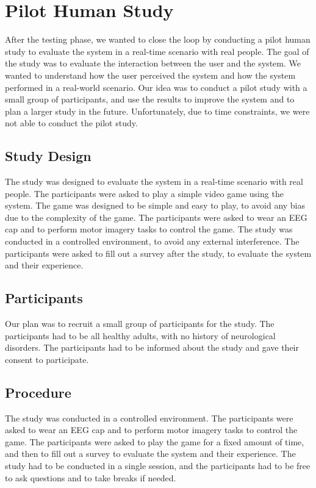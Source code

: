 \chapter{Pilot Human Study}\label{ch:human_study}
After the testing phase, we wanted to close the loop by conducting a pilot human study to evaluate the system in a real-time scenario with real people.
The goal of the study was to evaluate the interaction between the user and the system. 
We wanted to understand how the user perceived the system and how the system performed in a real-world scenario. 
Our idea was to conduct a pilot study with a small group of participants, and use the results to improve the system and to plan a larger study in the future.
Unfortunately, due to time constraints, we were not able to conduct the pilot study.

\section{Study Design}
The study was designed to evaluate the system in a real-time scenario with real people.
The participants were asked to play a simple video game using the system.
The game was designed to be simple and easy to play, to avoid any bias due to the complexity of the game.
The participants were asked to wear an EEG cap and to perform motor imagery tasks to control the game.
The study was conducted in a controlled environment, to avoid any external interference.
The participants were asked to fill out a survey after the study, to evaluate the system and their experience.

\section{Participants}
Our plan was to recruit a small group of participants for the study.
The participants had to be all healthy adults, with no history of neurological disorders.
The participants had to be informed about the study and gave their consent to participate.

\section{Procedure}
The study was conducted in a controlled environment.
The participants were asked to wear an EEG cap and to perform motor imagery tasks to control the game.
The participants were asked to play the game for a fixed amount of time, and then to fill out a survey to evaluate the system and their experience.
The study had to be conducted in a single session, and the participants had to be free to ask questions and to take breaks if needed.

